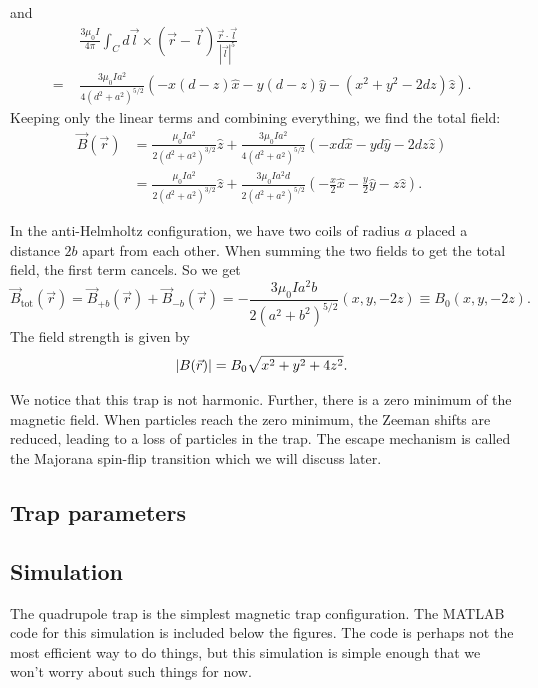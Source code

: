 \documentclass{article}
\theoremstyle{definition}
\newcommand{\f}[2]{\frac{#1}{#2}}
\begin{document}
and 
\begin{align*}
&\f{3\mu_0 I }{4\pi}\int_C d\vec{l}\times (\vec{r} - \vec{l}) \f{\vec{r}\cdot \vec{l}}{|\vec{l}|^5}\\ 
=\,\, &\f{3\mu_0 Ia^2}{4(d^2+a^2)^{5/2}} \left(- x(d-z)\hat{x}  - y (d-z)\hat{y} -  (x^2 + y^2 - 2dz)\hat{z}\right).
\end{align*}
Keeping only the linear terms and combining everything, we find the total field:
\begin{align*}
\vec{B}(\vec{r}) &= \f{\mu_0 I a^2}{2(d^2 + a^2)^{3/2}} \hat{z} + \f{3\mu_0 Ia^2}{4(d^2+a^2)^{5/2}} \left(- xd\hat{x}  -  y d\hat{y} - 2dz\hat{z}\right)\\
&= \f{\mu_0 I a^2}{2(d^2 + a^2)^{3/2}} \hat{z} + \f{3\mu_0 Ia^2 d}{2(d^2+a^2)^{5/2}} \left(- \f{x}{2}\hat{x}  -  \f{y}{2}\hat{y} - z\hat{z}\right).
\end{align*}






In the anti-Helmholtz configuration, we have two coils of radius $a$ placed a distance $2b$ apart from each other. When summing the two fields to get the total field, the first term cancels. So we get
\begin{equation*}
\vec{B}_\text{tot}(\vec{r}) = \vec{B}_{+b}(\vec{r}) + \vec{B}_{-b}(\vec{r}) = -\f{3\mu_0 I a^2 b}{2(a^2 + b^2)^{5/2}}\left( x,y,-2z \right) \equiv B_0 (x,y,-2z).
\end{equation*}
The field strength is given by 
\begin{equation*}
\abs{B(\vec{r})} = B_0 \sqrt{x^2 + y^2 + 4z^2}.
\end{equation*}

We notice that this trap is not harmonic. Further, there is a zero minimum of the magnetic field. When particles reach the zero minimum, the Zeeman shifts are reduced, leading to a loss of particles in the trap. The escape mechanism is called the Majorana spin-flip transition which we will discuss later. 


\subsection{Trap parameters}

\subsection{Simulation}


The quadrupole trap is the simplest magnetic trap configuration. The MATLAB code for this simulation is included below the figures. The code is perhaps not the most efficient way to do things, but this simulation is simple enough that we won't worry about such things for now. 
\end{document}
